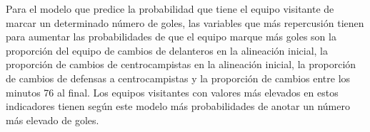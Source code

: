 Para el modelo que predice la probabilidad que tiene el equipo visitante de marcar un determinado
número de goles, las variables que más repercusión tienen para aumentar las probabilidades de 
que el equipo marque más goles son la proporción del equipo de cambios de delanteros en la 
alineación inicial, la proporción de cambios de centrocampistas en la alineación inicial, la 
proporción de cambios de defensas a centrocampistas y la proporción de cambios entre los 
minutos 76 al final. Los equipos visitantes con valores más elevados en estos indicadores tienen 
según este modelo más probabilidades de anotar un número más elevado de goles.





